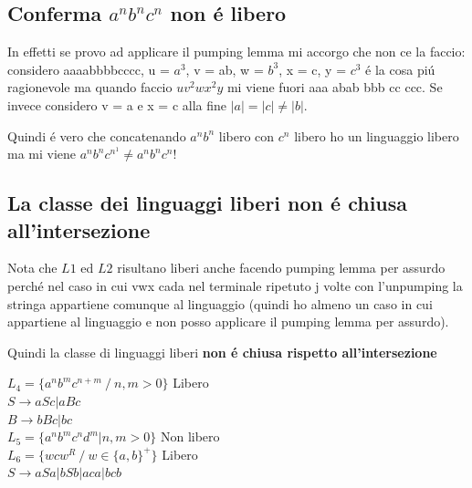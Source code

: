 \subsection{Conferma $a^n b^n c^n $ non \'e libero}
In effetti se provo ad applicare il pumping lemma mi accorgo che non ce la faccio:\\
considero aaaabbbbcccc, u = $a^3$, v = ab, w = $b^3$, x = c, y = $c^3$ \'e la cosa pi\'u ragionevole ma quando faccio 
$uv^2 wx^2 y$ mi viene fuori aaa abab bbb cc ccc. Se invece considero v = a e x = c alla fine $|a| = |c| \not = |b|$.

Quindi \'e vero che concatenando $a^n b^n$ libero con $c^n$ libero ho un linguaggio libero ma mi viene $a^n b^n c^{n^1} \not = a^n b^n c^n $!

\subsection{La classe dei linguaggi liberi non \'e chiusa all'intersezione}
Nota che $L1$ ed $L2$ risultano liberi anche facendo pumping lemma per assurdo perch\'e nel caso in cui vwx cada nel terminale ripetuto 
j volte con l'unpumping la stringa appartiene comunque al linguaggio (quindi ho almeno un caso in cui appartiene al linguaggio e non posso
applicare il pumping lemma per assurdo).

\begin{tcolorbox}\begin{center}
    Quindi la classe di linguaggi liberi \textbf{non \'e chiusa rispetto all'intersezione}
\end{center}\end{tcolorbox}

$L_4 = \{a^nb^mc^{n+m} \ / \ n,m>0\}$ Libero\\
$S \rightarrow aSc | aBc$\\
$B \rightarrow bBc|bc$\\

$L_5 = \{ a^nb^mc^nd^m | n,m > 0\}$ Non libero \\
$L_6= \{ wcw^R \ / \ w \in \{a,b\}^+\}$ Libero \\
$S \rightarrow aSa | bSb | aca|bcb$